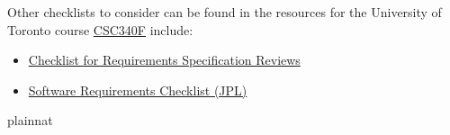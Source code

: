 \documentclass[12pt]{article}
\begin{document}
Other checklists to consider can be found in the resources for the University of
Toronto course
\href{https://www.cs.toronto.edu/~sme/CSC340F/2005/assignments/inspections/}
{CSC340F} include:

\begin{itemize}
  \item
  \href{https://www.cs.toronto.edu/~sme/CSC340F/2005/assignments/inspections/reqts_checklist.pdf}
  {Checklist for Requirements Specification Reviews}
  \item
  \href{https://www.cs.toronto.edu/~sme/CSC340F/2005/assignments/inspections/JPL_reqts_clist.pdf}
  {Software Requirements Checklist (JPL)}
\end{itemize}

 {plainnat}

\end{document}
